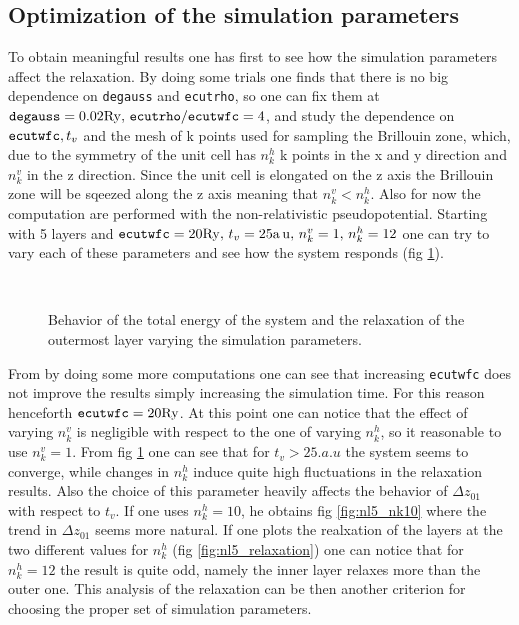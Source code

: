 \documentclass[a4paper, 11pt]{article}
\begin{document}
  \subsection{Optimization of the simulation parameters}
    To obtain meaningful results one has first to see how the simulation parameters affect the relaxation. By doing some trials one finds that there is no big dependence on \verb|degauss| and \verb|ecutrho|, so one can fix them at $\verb|degauss| = 0.02 \si{.Ry},\, \verb|ecutrho|/\verb|ecutwfc| = 4$, and study the dependence on $\verb|ecutwfc|, t_v$ and the mesh of k points used for sampling the Brillouin zone, which, due to the symmetry of the unit cell has $n_k^h$ k points in the x and y direction and $n_k^v$ in the z direction. Since the unit cell is elongated on the z axis the Brillouin zone will be sqeezed along the z axis meaning that $n_k^v < n_k^h$. Also for now the computation are performed with the non-relativistic pseudopotential.
    Starting with 5 layers and $\verb|ecutwfc| = 20 \si{.Ry},\, t_v = 25 \si{.a.u},\, n_k^v = 1,\, n_k^h = 12$ one can try to vary each of these parameters and see how the system responds (fig \ref{fig:nl5_tuning}).

    \begin{figure}[H]
      \centering
       \\
      \caption{Behavior of the total energy of the system and the relaxation of the outermost layer varying the simulation parameters.}
      \label{fig:nl5_tuning}
    \end{figure}

    From by doing some more computations one can see that increasing \verb|ecutwfc| does not improve the results simply increasing the simulation time. For this reason henceforth $\verb|ecutwfc| = 20 \si{.Ry}$. At this point one can notice that the effect of varying $n_k^v$ is negligible with respect to the one of varying $n_k^h$, so it reasonable to use $n_k^v = 1$.
    From fig \ref{fig:nl5_tuning} one can see that for $t_v > 25 \si{.a.u}$ the system seems to converge, while changes in $n_k^h$ induce quite high fluctuations in the relaxation results. Also the choice of this parameter heavily affects the behavior of $\Delta z_{01}$ with respect to $t_v$. If one uses $n_k^h = 10$, he obtains fig \ref{fig:nl5_nk10} where the trend in $\Delta z_{01}$ seems more natural.
    If one plots the realxation of the layers at the two different values for $n_k^h$ (fig \ref{fig:nl5_relaxation}) one can notice that for $n_k^h = 12$ the result is quite odd, namely the inner layer relaxes more than the outer one. This analysis of the relaxation can be then another criterion for choosing the proper set of simulation parameters.
\end{document}
